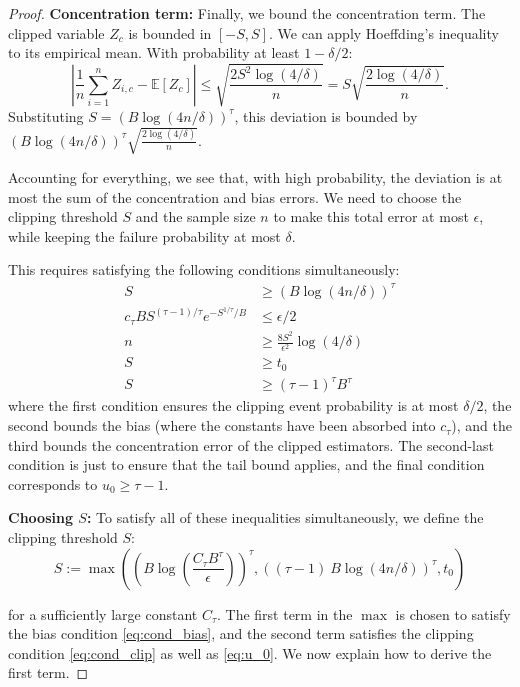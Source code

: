 \documentclass[10pt,a4paper]{amsart}
\newcommand{\E}{\mathbb{E}}
\begin{document}
\begin{proof}
\textbf{Concentration term:} Finally, we bound the concentration term. The clipped variable $Z_c$ is bounded in $[-S, S]$. We can apply Hoeffding's inequality to its empirical mean. With probability at least $1-\delta/2$:
\[
\left|\frac{1}{n}\sum_{i=1}^n Z_{i,c} - \E[Z_c]\right| \le \sqrt{\frac{2S^2\log(4/\delta)}{n}} = S\sqrt{\frac{2\log(4/\delta)}{n}}.
\]
Substituting $S = (B \log(4n/\delta))^\tau$, this deviation is bounded by $(B \log(4n/\delta))^\tau \sqrt{\frac{2\log(4/\delta)}{n}}$.

Accounting for everything, we see that, with high probability, the deviation is at most the sum of the concentration and bias errors. We need to choose the clipping threshold $S$ and the sample size $n$ to make this total error at most $\epsilon$, while keeping the failure probability at most $\delta$.

This requires satisfying the following conditions simultaneously: 
\begin{align}
    S &\ge (B \log(4n/\delta))^\tau \label{eq:cond_clip} \\
    c_\tau B S^{(\tau-1)/\tau} e^{-S^{1/\tau}/B} &\le \epsilon/2 \label{eq:cond_bias} \\
    n &\ge \frac{8 S^2}{\epsilon^2} \log(4/\delta) \label{eq:cond_conc}\\
	S &\ge t_0\\
    S &\ge (\tau-1)^{\tau} B^{\tau} \label{eq:u_0}
\end{align}
where the first condition ensures the clipping event probability is at most $\delta/2$, the second bounds the bias (where the constants have been absorbed into $c_\tau$), and the third bounds the concentration error of the clipped estimators. The second-last condition is just to ensure that the tail bound applies, and the final condition corresponds to $u_0 \geq \tau-1$. 

\textbf{Choosing $S$:} To satisfy all of these inequalities simultaneously, we define the clipping threshold $S$:
\[
S := \max\left( \left(B \log\left(\frac{C_\tau B^\tau}{\epsilon}\right)\right)^\tau, \left((\tau-1) ~B \log(4n/\delta)\right)^\tau, t_0 \right)
\]

for a sufficiently large constant $C_\tau$. The first term in the $\max$ is chosen to satisfy the bias condition \eqref{eq:cond_bias}, and the second term satisfies the clipping condition \eqref{eq:cond_clip} as well as \eqref{eq:u_0}. 
We now explain how to derive the first term.


\end{proof}
\end{document}
